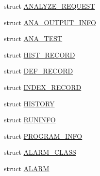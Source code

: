 \begin{DoxyCompactItemize}
\item 
struct \hyperlink{structANALYZE__REQUEST}{ANALYZE\_\-REQUEST}
\item 
struct \hyperlink{structANA__OUTPUT__INFO}{ANA\_\-OUTPUT\_\-INFO}
\item 
struct \hyperlink{structANA__TEST}{ANA\_\-TEST}
\item 
struct \hyperlink{structHIST__RECORD}{HIST\_\-RECORD}
\item 
struct \hyperlink{structDEF__RECORD}{DEF\_\-RECORD}
\item 
struct \hyperlink{structINDEX__RECORD}{INDEX\_\-RECORD}
\item 
struct \hyperlink{structHISTORY}{HISTORY}
\item 
struct \hyperlink{structRUNINFO}{RUNINFO}
\item 
struct \hyperlink{structPROGRAM__INFO}{PROGRAM\_\-INFO}
\item 
struct \hyperlink{structALARM__CLASS}{ALARM\_\-CLASS}
\item 
struct \hyperlink{structALARM}{ALARM}
\end{DoxyCompactItemize}
